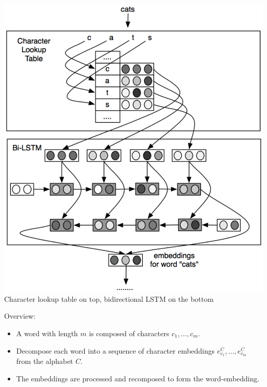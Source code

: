 \documentclass[11pt, a4paper, landscape]{article}
\begin{document}
\NewPage{}

\vfill
\begin{minipage}[b]{.4\linewidth}
  \begin{center}
    \includegraphics[width=\linewidth]{../article/img/bi-lstm-emeddings}\\
    Character lookup table on top, bidirectional LSTM on the bottom
  \end{center}
\end{minipage}
\begin{minipage}[b]{.6\linewidth}
  Overview:
  \begin{itemize}
  \item A word with length $m$ is composed of characters $c_1, \dots, c_m$.
  \item Decompose each word into a sequence of character embeddings $e_{c_1}^C, \dots, e_{c_m}^C$ from the alphabet $C$.
  \item The embeddings are processed and recomposed to form the word-embedding.
  \end{itemize}
\end{minipage}
\vfill
\end{document}
